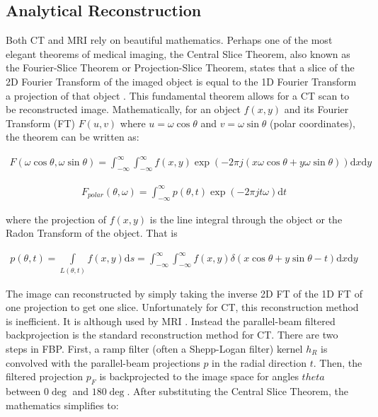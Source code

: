 \documentclass{bmcart}
\begin{document}
\subsection*{Analytical Reconstruction}
Both CT and MRI rely on beautiful mathematics. Perhaps one of the most elegant theorems of medical imaging, the Central Slice Theorem, also known as the Fourier-Slice Theorem or Projection-Slice Theorem, states that a slice of the 2D Fourier Transform of the imaged object is equal to the 1D Fourier Transform a projection of that object \cite{gonzalez_digital_2008}. This fundamental theorem allows for a CT scan to be reconstructed image. Mathematically, for an object $f(x,y)$ and its Fourier Transform (FT) $F(u,v)$ where $u=\omega\cos\theta$ and $v=\omega\sin\theta$ (polar coordinates), the theorem can be written as:
\begin{ceqn}
\begin{align}
        F(\omega\cos\theta,\omega\sin\theta)=\int_{-\infty}^{\infty} \int_{-\infty}^{\infty} f(x,y)\exp{(-2\pi j (x\omega\cos{\theta}+y\omega\sin{\theta}))} \mathrm{d}x \mathrm{d}y
\end{align}
\end{ceqn}
\begin{ceqn}
\begin{align}
        F_{polar}(\theta,\omega)=\int_{-\infty}^{\infty} p(\theta,t)\exp{(-2\pi j t \omega)}\mathrm{d}t
\end{align}
\end{ceqn}
where the projection of $f(x,y)$ is the line integral through the object or the Radon Transform of the object. That is
\begin{ceqn}
\begin{align}
        p(\theta,t)=\int\limits_{L(\theta,t)}f(x,y) \mathrm{d}s = \int_{-\infty}^{\infty} \int_{-\infty}^{\infty} f(x,y)\delta{(x\cos{\theta}+y\sin{\theta}-t)} \mathrm{d}x \mathrm{d}y
\end{align}
\end{ceqn}
\par The image can reconstructed by simply taking the inverse 2D FT of the 1D FT of one projection to get one slice. Unfortunately for CT, this reconstruction method is inefficient. It is although used by MRI \cite{farncombe_medical_2014}. Instead the parallel-beam filtered backprojection is the standard reconstruction method for CT. There are two steps in FBP. First, a ramp filter (often a Shepp-Logan filter) kernel $h_R$ is convolved with the parallel-beam projections $p$ in the radial direction $t$. Then, the filtered projection $p_F$ is backprojected to the image space for angles $theta$ between $0 \deg$ and $180 \deg$. After substituting the Central Slice Theorem, the mathematics simplifies to:
\end{document}
